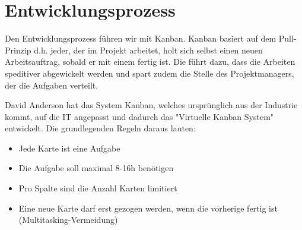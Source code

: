 \section{Entwicklungsprozess}

Den Entwicklungsprozess führen wir mit Kanban. Kanban basiert auf dem Pull-Prinzip d.h. jeder, der im Projekt arbeitet, holt sich selbst einen neuen Arbeitsauftrag, sobald er mit einem fertig ist. Die führt dazu, dass die Arbeiten speditiver abgewickelt werden und spart zudem die Stelle des Projektmanagers, der die Aufgaben verteilt.


David Anderson \cite{AndersonDavidJ2011K:eC} hat das System Kanban, welches ursprünglich aus der Industrie kommt, auf die IT angepasst und dadurch das "Virtuelle Kanban System" entwickelt. Die grundlegenden Regeln daraus lauten:

\begin{itemize}  
\item Jede Karte ist eine Aufgabe
\item Die Aufgabe soll maximal 8-16h benötigen
\item Pro Spalte sind die Anzahl Karten limitiert
\item Eine neue Karte darf erst gezogen werden, wenn die vorherige fertig ist (Multitasking-Vermeidung)
\end{itemize}

